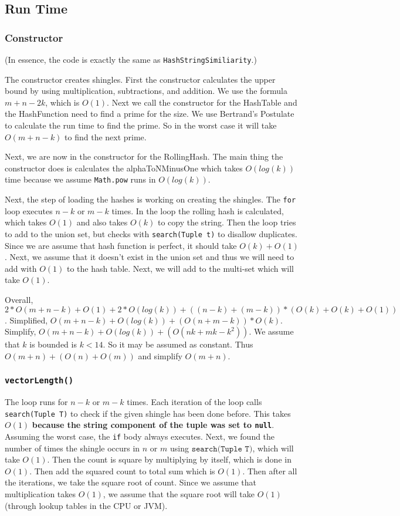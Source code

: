 \documentclass[10pt,letterpaper]{article}
\begin{document}
\subsection{Run Time}
\subsubsection{Constructor}
(In essence, the code is exactly the same as \texttt{HashStringSimiliarity}.)

The constructor creates shingles. First the constructor calculates the upper bound by using multiplication, subtractions, and addition. We use the formula $m+n-2k$, which is $O(1)$.
Next we call the constructor for the HashTable and the HashFunction need to find a prime for the size. We use Bertrand's Postulate to calculate the run time to find the prime. So in the worst case it will take $O(m+n-k)$ to find the next prime.

Next, we are now in the constructor for the RollingHash. The main thing the constructor does is
calculates the alphaToNMinusOne which takes $O(log(k))$ time because we assume \texttt{Math.pow} runs in $O(log(k))$.

Next, the step of loading the hashes is working on creating the shingles. The \texttt{for} loop executes $n-k$ or $m-k$ times. In the loop the rolling hash is calculated, which takes $O(1)$ and also takes $O(k)$ to copy the string. Then the loop tries to add to the union set, but checks with \texttt{search(Tuple t)} to disallow duplicates. Since we are assume that hash function is perfect, it should take $O(k) + O(1)$. Next, we assume that it doesn't exist in the union set and thus we will need to add with $O(1)$ to the hash table. Next, we will add to the multi-set which will take $O(1)$. 

Overall, $2*O(m+n-k)+O(1)+2*O(log(k))+((n-k)+(m-k))*(O(k)+O(k)+O(1))$. 
Simplified, $O(m+n-k)+O(log(k))+(O(n+m-k))*O(k)$. 
Simplify, $O(m+n-k)+O(log(k))+(O(nk+mk-k^2))$. We assume that $k$ is bounded is $k<14$. So it may be assumed as constant.
Thus $O(m+n)+(O(n)+O(m))$ and simplify $O(m+n)$.
\subsubsection{\texttt{vectorLength()}}
The loop runs for $n-k$ or $m-k$ times. Each iteration of the loop calls \texttt{search(Tuple T)} to check if the given shingle has been done before. This takes $O(1)$ \textbf{because the string component of the tuple was set to \texttt{null}}. Assuming the worst case, the \texttt{if} body always executes. Next, we found the number of times the shingle occurs in $n$ or $m$ using $ \texttt{search(Tuple T)}$, which will take $O(1)$. Then the count is square by multiplying by itself, which is done in $O(1)$. Then add the squared count to total sum which is $O(1)$. Then after all the iterations, we take the square root of count. Since we assume that multiplication takes $O(1)$, we assume that the square root will take $O(1)$ (through lookup tables in the CPU or JVM).
\end{document}
